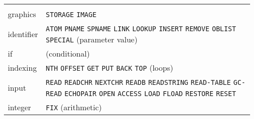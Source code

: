 \documentclass[a4paper]{scrbook}
\begin{document}
\begin{longtable}[]{@{}ll@{}}
\begin{minipage}[t]{0.83\columnwidth}
\end{minipage}\tabularnewline
\begin{minipage}[t]{0.11\columnwidth}\raggedright\strut
graphics\strut
\end{minipage} & \begin{minipage}[t]{0.83\columnwidth}\raggedright\strut
\texttt{STORAGE} \texttt{IMAGE}\strut
\end{minipage}\tabularnewline
\begin{minipage}[t]{0.11\columnwidth}\raggedright\strut
identifier\strut
\end{minipage} & \begin{minipage}[t]{0.83\columnwidth}\raggedright\strut
\texttt{ATOM} \texttt{PNAME} \texttt{SPNAME} \texttt{LINK} \texttt{LOOKUP} \texttt{INSERT} \texttt{REMOVE} \texttt{OBLIST}
\texttt{SPECIAL} (parameter value)\strut
\end{minipage}\tabularnewline
\begin{minipage}[t]{0.11\columnwidth}\raggedright\strut
if\strut
\end{minipage} & \begin{minipage}[t]{0.83\columnwidth}\raggedright\strut
(conditional)\strut
\end{minipage}\tabularnewline
\begin{minipage}[t]{0.11\columnwidth}\raggedright\strut
indexing\strut
\end{minipage} & \begin{minipage}[t]{0.83\columnwidth}\raggedright\strut
\texttt{NTH} \texttt{OFFSET} \texttt{GET} \texttt{PUT} \texttt{BACK} \texttt{TOP} (loops)\strut
\end{minipage}\tabularnewline
\begin{minipage}[t]{0.11\columnwidth}\raggedright\strut
input\strut
\end{minipage} & \begin{minipage}[t]{0.83\columnwidth}\raggedright\strut
\texttt{READ} \texttt{READCHR} \texttt{NEXTCHR} \texttt{READB} \texttt{READSTRING} \texttt{READ-TABLE} \texttt{GC-READ}
\texttt{ECHOPAIR} \texttt{OPEN} \texttt{ACCESS} \texttt{LOAD} \texttt{FLOAD} \texttt{RESTORE} \texttt{RESET}\strut
\end{minipage}\tabularnewline
\begin{minipage}[t]{0.11\columnwidth}\raggedright\strut
integer\strut
\end{minipage} & \begin{minipage}[t]{0.83\columnwidth}\raggedright\strut
\texttt{FIX} (arithmetic)\strut
\end{minipage}\tabularnewline

\end{longtable}
\end{document}
